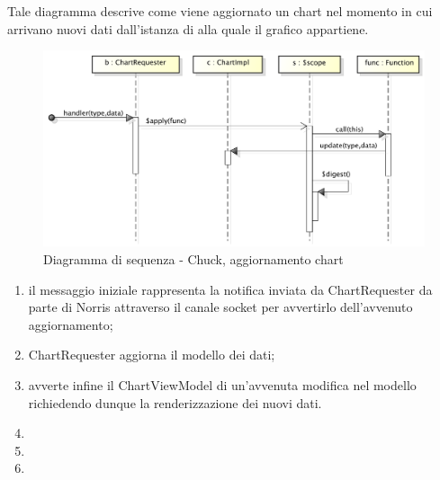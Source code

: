             Tale diagramma descrive come viene aggiornato un chart nel momento in cui arrivano nuovi dati dall'istanza di  alla quale il grafico appartiene.
            \begin{figure}[H]
                \centering
                \includegraphics[scale=0.3]{DefinizioneDiProdotto/Pics/ChuckAggiornamentoChart}
                \caption{Diagramma di sequenza - Chuck, aggiornamento chart}
            \end{figure}
            \begin{enumerate}
                \item il messaggio iniziale rappresenta la notifica inviata da ChartRequester da parte di Norris attraverso il canale socket per avvertirlo dell'avvenuto aggiornamento;
                \item ChartRequester aggiorna il modello dei dati;
                \item avverte infine il ChartViewModel di un'avvenuta modifica nel modello richiedendo dunque la renderizzazione dei nuovi dati.
                \item
                \item
                \item
            \end{enumerate}
